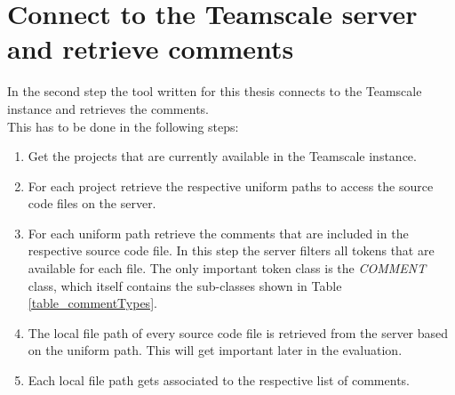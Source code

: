 \section{Connect to the Teamscale server and retrieve comments}
In the second step the tool written for this thesis connects to the Teamscale instance and retrieves the comments.\\
This has to be done in the following steps:
\begin{enumerate}
	\item Get the projects that are currently available in the Teamscale instance. 
	\item For each project retrieve the respective uniform paths to access the source code files on the server.
	\item For each uniform path retrieve the comments that are included in the respective source code file. In this step the server filters all tokens that are available for each file. The only important token class is the \textit{COMMENT} class, which itself contains the sub-classes shown in Table \ref{table_commentTypes}.
	\item The local file path of every source code file is retrieved from the server based on the uniform path. This will get important later in the evaluation.
	\item Each local file path gets associated to the respective list of comments.
\end{enumerate}

 
